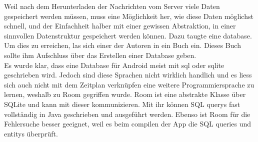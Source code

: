 \documentclass[a4paper,11pt]{article}
\begin{document}
Weil nach dem Herunterladen der Nachrichten vom Server viele Daten gespeichert werden müssen, muss eine Möglichkeit her, wie diese Daten möglichst schnell, 
und der Einfachheit halber mit einer gewissen Abstraktion, in einer sinnvollen Datenstruktur gespeichert werden können. Dazu taugte eine \gls{database}. Um dies zu erreichen, 
las sich einer der Autoren in ein Buch ein. Dieses Buch sollte ihm Aufschluss über das Erstellen einer Database geben.  \\

Es wurde klar, dass eine Database für Android meist mit \gls{sql} oder \gls{sqlite} geschrieben wird. Jedoch sind diese Sprachen nicht wirklich handlich und es
liess sich auch nicht mit dem Zeitplan verknüpfen eine weitere Programmiersprache zu lernen, weshalb zu Room gegriffen wurde. Room ist eine abstrakte Klasse über SQLite 
und kann mit dieser kommunizieren. Mit ihr können SQL \glspl{query} fast vollständig in Java geschrieben und ausgeführt werden. Ebenso ist Room für die Fehlersuche besser geeignet, 
weil es beim compilen der App die SQL queries und \glspl{entity} überprüft. \cite{roomInfo} \\

\newpage

\begingroup
\setlength{\intextsep}{7pt}
\setlength{\columnsep}{15pt}
\end{document}

